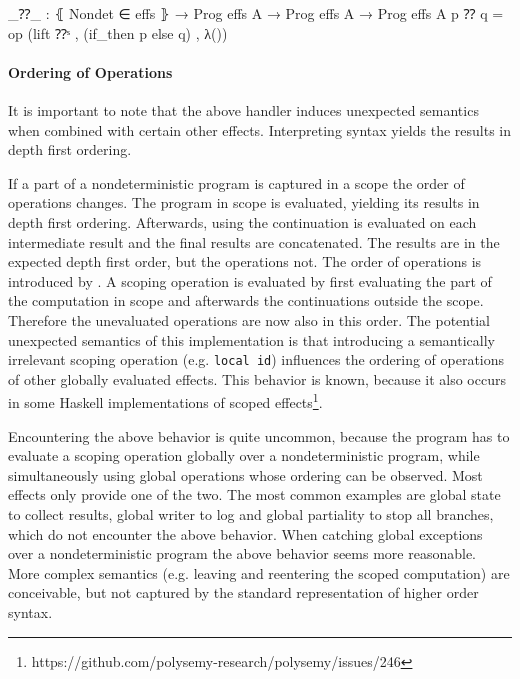 \begin{code}
_⁇_ : ⦃ Nondet ∈ effs ⦄ → Prog effs A → Prog effs A → Prog effs A
p ⁇ q = op (lift ⁇ˢ , (if_then p else q) , λ())
\end{code}

\paragraph{Ordering of Operations}
It is important to note that the above handler induces unexpected semantics when
combined with certain other effects.
Interpreting  syntax yields the results in depth first
ordering.

If a part of a nondeterministic program is captured in a scope the order of
operations changes.
The program in scope is evaluated, yielding its results in depth first ordering.
Afterwards, using  the continuation is evaluated on each
intermediate result and the final results are concatenated.
The results are in the expected depth first order, but the operations not.
The order of operations is introduced by \AgdaFunction{>>=}.
A scoping operation is evaluated by first evaluating the part of the computation
in scope and afterwards the continuations outside the scope.
Therefore the unevaluated operations are now also in this order.
The potential unexpected semantics of this implementation is that introducing a
semantically irrelevant scoping operation (e.g. \texttt{local id}) influences
the ordering of operations of other globally evaluated effects.
This behavior is known, because it also occurs in some Haskell implementations
of scoped
effects\footnote{https://github.com/polysemy-research/polysemy/issues/246}.

Encountering the above behavior is quite uncommon, because the program has to
evaluate a scoping operation globally over a nondeterministic program, while
simultaneously using global operations whose ordering can be observed.
Most effects only provide one of the two.
The most common examples are global state to collect results, global writer to
log and global partiality to stop all branches, which do not encounter the above
behavior.
When catching global exceptions over a nondeterministic program the above
behavior seems more reasonable.
More complex semantics (e.g. leaving and reentering the scoped computation) are
conceivable, but not captured by the standard representation of higher order
syntax.


